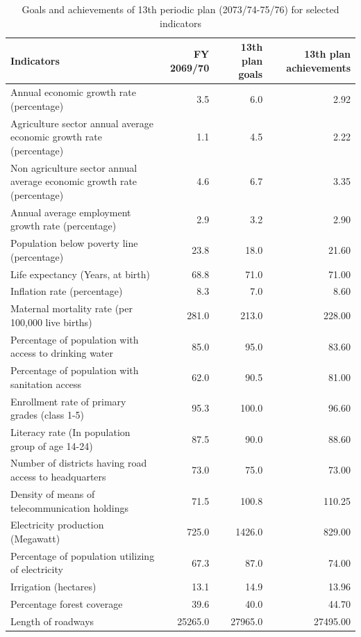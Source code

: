 \documentclass[
  openany]{book}
\begin{document}
\begin{table}

\caption{\label{tab:forteenth-periodic-plan}Goals and achievements of 13th periodic plan (2073/74-75/76) for selected indicators}
\centering
\begin{tabular}[t]{>{\raggedright\arraybackslash}p{18em}rrr}
\toprule
Indicators & FY 2069/70 & 13th plan goals & 13th plan achievements\\
\midrule
\rowcolor{gray!6}  Annual economic growth rate (percentage) & 3.5 & 6.0 & 2.92\\
Agriculture sector annual average economic growth rate (percentage) & 1.1 & 4.5 & 2.22\\
\rowcolor{gray!6}  Non agriculture sector annual average economic growth rate (percentage) & 4.6 & 6.7 & 3.35\\
Annual average employment growth rate (percentage) & 2.9 & 3.2 & 2.90\\
\rowcolor{gray!6}  Population below poverty line (percentage) & 23.8 & 18.0 & 21.60\\
\addlinespace
Life expectancy (Years, at birth) & 68.8 & 71.0 & 71.00\\
\rowcolor{gray!6}  Inflation rate (percentage) & 8.3 & 7.0 & 8.60\\
Maternal mortality rate (per 100,000 live births) & 281.0 & 213.0 & 228.00\\
\rowcolor{gray!6}  Percentage of population with access to drinking water & 85.0 & 95.0 & 83.60\\
Percentage of population with sanitation access & 62.0 & 90.5 & 81.00\\
\addlinespace
\rowcolor{gray!6}  Enrollment rate of primary grades (class 1-5) & 95.3 & 100.0 & 96.60\\
Literacy rate (In population group of age 14-24) & 87.5 & 90.0 & 88.60\\
\rowcolor{gray!6}  Number of districts having road access to headquarters & 73.0 & 75.0 & 73.00\\
Density of means of telecommunication holdings & 71.5 & 100.8 & 110.25\\
\rowcolor{gray!6}  Electricity production (Megawatt) & 725.0 & 1426.0 & 829.00\\
\addlinespace
Percentage of population utilizing of electricity & 67.3 & 87.0 & 74.00\\
\rowcolor{gray!6}  Irrigation (hectares) & 13.1 & 14.9 & 13.96\\
Percentage forest coverage & 39.6 & 40.0 & 44.70\\
\rowcolor{gray!6}  Length of roadways & 25265.0 & 27965.0 & 27495.00\\
\bottomrule
\end{tabular}
\end{table}
\end{document}
